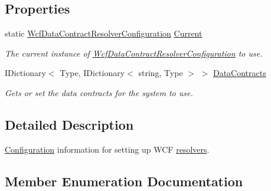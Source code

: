 \subsection*{Properties}
\begin{DoxyCompactItemize}
\item 
static \hyperlink{classCqrs_1_1Services_1_1WcfDataContractResolverConfiguration}{Wcf\+Data\+Contract\+Resolver\+Configuration} \hyperlink{classCqrs_1_1Services_1_1WcfDataContractResolverConfiguration_a22cf32559867b0a067950c4ce35504b2_a22cf32559867b0a067950c4ce35504b2}{Current}
\begin{DoxyCompactList}\small\item\em The current instance of \hyperlink{classCqrs_1_1Services_1_1WcfDataContractResolverConfiguration}{Wcf\+Data\+Contract\+Resolver\+Configuration} to use. \end{DoxyCompactList}\item 
I\+Dictionary$<$ Type, I\+Dictionary$<$ string, Type $>$ $>$ \hyperlink{classCqrs_1_1Services_1_1WcfDataContractResolverConfiguration_a8a764a7cebaf9ebdcdc1176a9fba0b3a_a8a764a7cebaf9ebdcdc1176a9fba0b3a}{Data\+Contracts}
\begin{DoxyCompactList}\small\item\em Gets or set the data contracts for the system to use. \end{DoxyCompactList}\end{DoxyCompactItemize}


\subsection{Detailed Description}
\hyperlink{namespaceCqrs_1_1Configuration}{Configuration} information for setting up W\+CF \hyperlink{}{resolvers}. 



\subsection{Member Enumeration Documentation}
\mbox{\label{classCqrs_1_1Services_1_1WcfDataContractResolverConfiguration_acf6a145eb88c5d98b31a541cfb1fb152_acf6a145eb88c5d98b31a541cfb1fb152}} 
